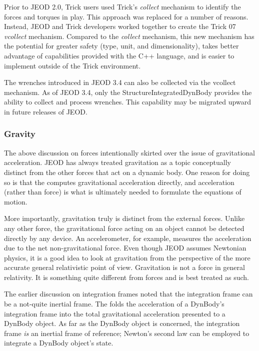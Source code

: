 Prior to JEOD 2.0, Trick users used Trick's \emph{collect} mechanism to
identify the forces and torques in play. This approach was replaced for a
number of reasons. Instead, JEOD and Trick developers worked
together to create the Trick 07 \emph{vcollect} mechanism. Compared to the
\emph{collect} mechanism, this new mechanism has the potential for greater
safety (type, unit, and dimensionality),
takes better advantage of capabilities provided with the C++ language,
and is easier to implement outside of the Trick environment.

The wrenches introduced in JEOD 3.4 can also be collected via the vcollect
mechanism. As of JEOD 3.4, only the StructureIntegratedDynBody provides the
ability to collect and process wrenches. This capability may be migrated upward
in future releases of JEOD.

\subsubsection{Gravity}
The above discussion on forces intentionally skirted over the issue of
gravitational acceleration. JEOD has always treated gravitation as a topic
conceptually distinct from the other forces that act on a dynamic body.
One reason for doing so is that the  computes
gravitational acceleration directly, and acceleration (rather than force)
is what is ultimately needed to formulate the equations of motion.

More importantly, gravitation truly is distinct from the external forces.
Unlike any other force, the gravitational force acting on an object cannot be
detected directly by any device. An accelerometer, for example, measures the
acceleration due to the net non-gravitational force. Even though JEOD assumes
Newtonian physics, it is a good idea to look at gravitation from the
perspective of the more accurate general relativistic point of view.
Gravitation is not a force in general relativity. It is something quite
different from forces and is best treated as such.

The earlier discussion on integration frames noted that the integration
frame can be a not-quite inertial frame. The \GRAVITY folds the acceleration
of a DynBody's integration frame into the total gravitational acceleration
presented to a DynBody object. As far as the DynBody object is concerned,
the integration frame \emph{is} an inertial frame of reference; Newton's
second law can be employed to integrate a DynBody object's state.

